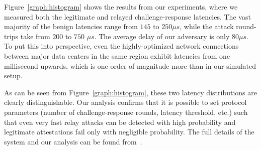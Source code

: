 Figure~\ref{graph:histogram} shows the results from our experiments, where we measured both the legitimate and relayed challenge-response latencies. The vast majority of the benign latencies range from $145$ to $250 \mu s$, while the attack round-trips take from $200$ to $750$ $\mu s$. The average delay of our adversary is only $80 \mu s$. To put this into perspective, even the highly-optimized network connections between major data centers in the same region exhibit latencies from one millisecond upwards, which is one order of magnitude more than in our simulated setup. 

As can be seen from Figure~\ref{graph:histogram}, these two latency distributions are clearly distinguishable. Our analysis confirms that it is possible to set protocol parameters (number of challenge-response rounds, latency threshold, etc.) such that even very fast relay attacks can be detected with high probability and legitimate attestations fail only with negligible probability. The full details of the \proximitee system and our analysis can be found from~\cite{proximitee}.





